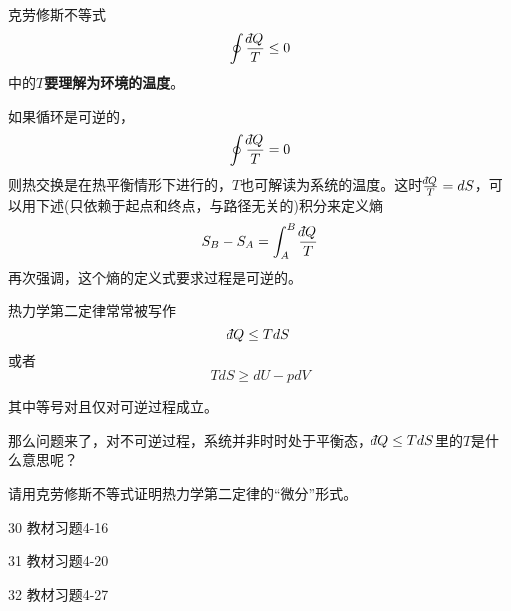 \documentclass[CJK]{beamer}
\begin{document}
\begin{frame}
\bch
克劳修斯不等式
{\blue $$\oint \frac{\dbar Q}{T} \le 0 $$}
中的{\bf $T$要理解为环境的温度}。

如果循环是可逆的，
$$\oint \frac{\dbar Q}{T} = 0$$
则热交换是在热平衡情形下进行的，$T$也可解读为系统的温度。这时$\frac{\dbar Q}{T} = dS$，可以用下述(只依赖于起点和终点，与路径无关的)积分来定义熵
$$S_B-S_A = \int_A^B \frac{\dbar Q}{T} $$
再次强调，这个熵的定义式要求过程是可逆的。

\ech
\end{frame}

\begin{frame}
\bch
热力学第二定律常常被写作
$$\dbar Q \le TdS$$
或者
$$ TdS \ge dU - pdV $$

其中等号对且仅对可逆过程成立。
\ech
\end{frame}

\begin{frame}
\bch


那么问题来了，对不可逆过程，系统并非时时处于平衡态，$\dbar Q \le TdS$里的$T$是什么意思呢？

\ech
\end{frame}

\begin{frame}
\bch


请用克劳修斯不等式证明热力学第二定律的“微分”形式。

\ech
\end{frame}

\begin{frame}
\bch

\bitem
\item[30]{教材习题4-16}
\item[31]{教材习题4-20}
\item[32]{教材习题4-27}
\eitem

\ech
\end{frame}
\end{document}
